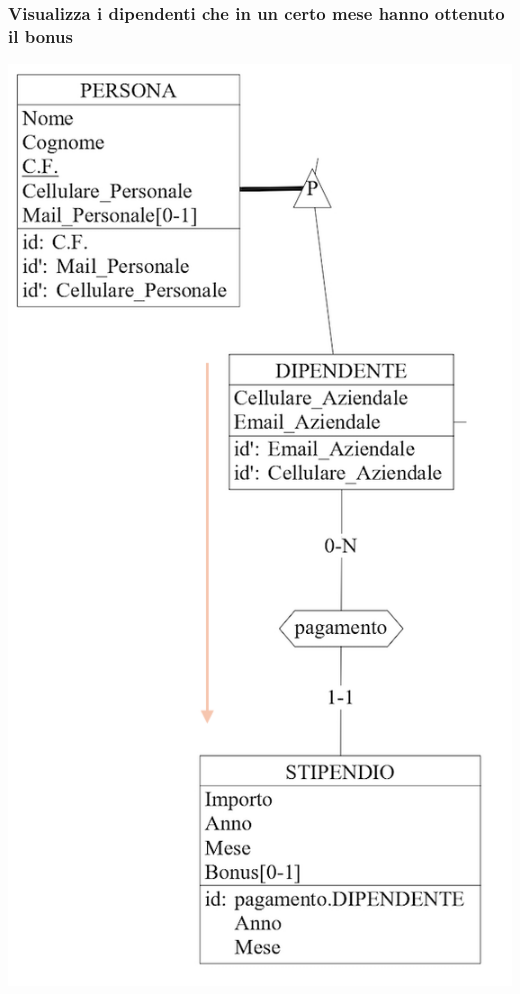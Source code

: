 \documentclass[12pt]{article}
\begin{document}
\subsubsection{Visualizza i dipendenti che in un certo mese hanno ottenuto il
bonus} \label{Visualizza i dipendenti che in un certo mese hanno ottenuto il
bonus}

\begin{center}
    \includegraphics[scale=0.50]{images/bonusDipendenti.png}
\end{center}
\end{document}
